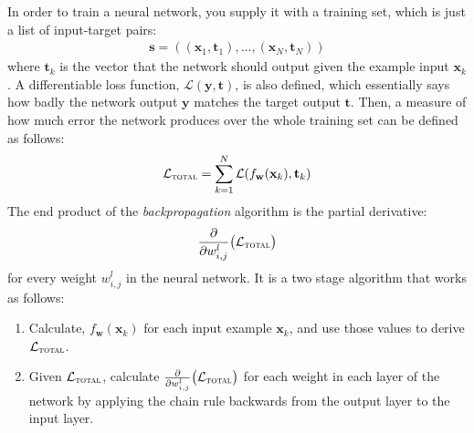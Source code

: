 \documentclass[a4paper, 12pt]{report}
\newcommand{\tit}[1]{\textit{#1}}
\begin{document}
In order to train a neural network, you supply it with a training set, which is just a list of input-target pairs:
\begin{gather*}
	\mathbf{s} = ((\mathbf{x}_1, \mathbf{t}_1), ..., (\mathbf{x}_N, \mathbf{t}_N))
\end{gather*}
where $\mathbf{t}_k$ is the vector that the network should output given the example input $\mathbf{x}_k$. A differentiable loss function, $\mathcal{L}(\mathbf{y}, \mathbf{t})$, is also defined, which essentially says how badly the network output $\mathbf{y}$ matches the target output $\mathbf{t}$. Then, a measure of how much error the network produces over the whole training set can be defined as follows:
\begin{gather}
	\mathcal{L}_{\text{\scshape total}} = \sum_{k = 1}^N \mathcal{L}(f_{\mathbf{w}}(\mathbf{x}_k), \mathbf{t}_k)
\end{gather}
The end product of the \tit{backpropagation} algorithm is the partial derivative:
\begin{gather*}
	\frac{\partial}{\partial w_{i,j}^l} \big( \mathcal{L}_{\text{\scshape total}} \big)
\end{gather*}
for every weight $w_{i,j}^l$ in the neural network. It is a two stage algorithm that works as follows:
\begin{enumerate}
\item
	Calculate, $f_{\mathbf{w}}(\mathbf{x}_k)$ for each input example $\mathbf{x}_k$, and use those values to derive $\mathcal{L}_{\text{\scshape total}}$.
\item
	Given $\mathcal{L}_{\text{\scshape total}}$, calculate $\frac{\partial}{\partial w_{i,j}^l} \big( \mathcal{L}_{\text{\scshape total}} \big)$ for each weight in each layer of the network by applying the chain rule backwards from the output layer to the input layer.
\end{enumerate}
\end{document}
